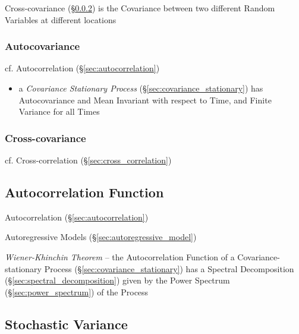 Cross-covariance (\S\ref{sec:cross_covariance}) is the Covariance between two
different Random Variables at different locations



\subsubsection{Autocovariance}\label{sec:autocovariance}

cf. Autocorrelation (\S\ref{sec:autocorrelation}) %

\begin{itemize}
  \item a \emph{Covariance Stationary Process}
    (\S\ref{sec:covariance_stationary}) has Autocovariance and Mean
    Invariant with respect to Time, and Finite Variance for all Times
\end{itemize}



\subsubsection{Cross-covariance}\label{sec:cross_covariance}

cf. Cross-correlation (\S\ref{sec:cross_correlation})



\subsection{Autocorrelation Function}\label{sec:autocorrelation_function}

Autocorrelation (\S\ref{sec:autocorrelation})

Autoregressive Models (\S\ref{sec:autoregressive_model})

\emph{Wiener-Khinchin Theorem} -- the Autocorrelation Function of a
Covariance-stationary Process (\S\ref{sec:covariance_stationary}) has a Spectral
Decomposition (\S\ref{sec:spectral_decomposition}) given by the Power Spectrum
(\S\ref{sec:power_spectrum}) of the Process



\subsection{Stochastic Variance}\label{sec:stochastic_variance}

